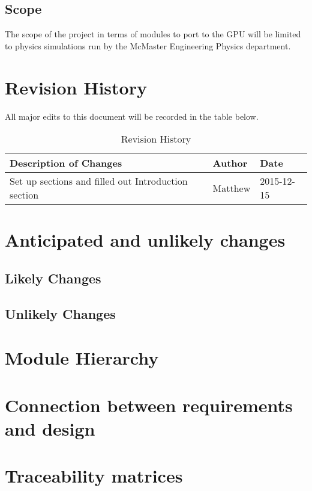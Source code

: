 \documentclass[12pt]{article}
\begin{document}
\subsection{Scope}
The scope of the project in terms of modules to port to the GPU will be limited to physics simulations run by the McMaster Engineering Physics department.

\section*{Revision History}
All major edits to this document will be recorded in the table below.

\begin{table}[h]
\centering
\caption{Revision History}\label{Table_Revision}
\begin{tabular}{lll}

\toprule
\bf Description of Changes & \bf Author & \bf Date\\\midrule
Set up sections and filled out Introduction section & Matthew & 2015-12-15\\
\bottomrule
\end{tabular}
\end{table}

\section{Anticipated and unlikely changes}
\subsection{Likely Changes} %

\subsection{Unlikely Changes} %

\section{Module Hierarchy}%

\section{Connection between requirements and design}%

\section{Traceability matrices}%
\end{document}
